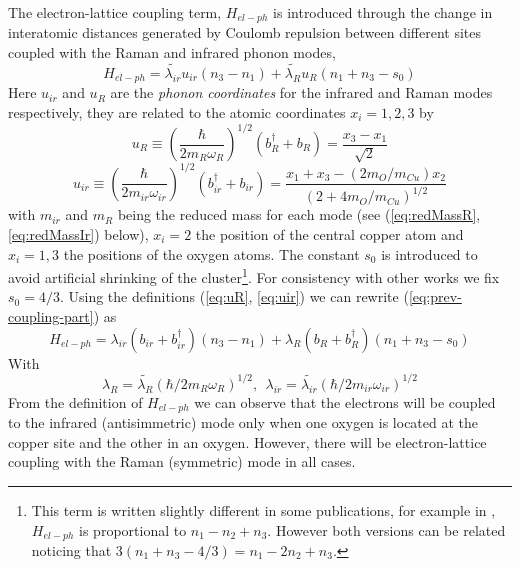 The electron-lattice coupling term, $H_{el-ph}$ is introduced through the change in interatomic distances generated by Coulomb repulsion between different sites coupled with the Raman and infrared phonon modes,
%
\begin{equation}
  \label{eq:prev-coupling-part}
  H_{el-ph} = \tilde{\lambda_{ir}}u_{ir}(n_3 - n_1) + \tilde{\lambda_R} u_R (n_1 + n_3-s_0)
\end{equation}
%
Here $u_{ir}$ and $u_R$ are the \textit{phonon coordinates} for the infrared and Raman modes respectively, they are related to the atomic coordinates $x_i=1,2,3$ by
%
%
\begin{equation}
  \label{eq:uR}
  u_R \equiv \left(\frac{\hbar}{2 m_R \omega_R}\right)^{1/2}(b_R^\dagger + b_R) = \frac{x_3 - x_1}{\sqrt{2}}
\end{equation}
%
\begin{equation}
  \label{eq:uir}
  u_{ir} \equiv \left(\frac{\hbar}{2 m_{ir} \omega_{ir}}\right)^{1/2}(b^\dagger_{ir}+b_{ir}) = \frac{ x_1 + x_3 - ( 2 m_O/m_{Cu})x_2}{(2 + 4 m_O/m_{Cu})^{1/2}}
\end{equation}
%
with $m_{ir}$ and $m_R$ being the reduced mass for each mode (see (\ref{eq:redMassR}, \ref{eq:redMassIr}) below), $x_i=2$ the position of the central copper atom and $x_i=1,3$ the positions of the oxygen atoms.
The constant $s_0$ is introduced to avoid artificial shrinking of the cluster\footnote{This term is written slightly different in some publications, for example in \cite{MustredeLeon1992}, $H_{el-ph}$ is proportional to $n_1-n_2+n_3$. However both versions can be related noticing that $3 (n_1+n_3-4/3)=n_1-2n_2+n_3$.}. 
For consistency with other works \cite{MustredeLeon1992,DeLeon1999,Leon2008,MirandaMena2007} we fix $s_0=4/3$. 
Using the definitions (\ref{eq:uR}, \ref{eq:uir}) we can rewrite (\ref{eq:prev-coupling-part}) as
%
\begin{equation}
  \label{eq:coupling-part}
  H_{el-ph} = \lambda_{ir}(b_{ir} + b_{ir}^\dagger)(n_3 - n_1) + \lambda_R (b_R + b_R^\dagger) (n_1 + n_3-s_0)
\end{equation}
%
With 
%
\begin{equation}
  \label{eq:coupling-constants}
  \lambda_R=\tilde{\lambda_R}(\hbar/2m_R\omega_R)^{1/2},\ \ \lambda_{ir}=\tilde{\lambda_{ir}}(\hbar/2m_{ir}\omega_{ir})^{1/2}
\end{equation}
From the definition of $H_{el-ph}$ we can observe that the electrons will be coupled to the infrared (antisimmetric) mode only when one oxygen is located at the copper site and the other in an oxygen.
However, there will be electron-lattice coupling with the Raman (symmetric) mode in all cases.

